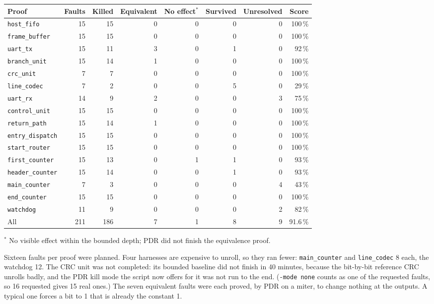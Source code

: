 \documentclass[11pt,a4paper]{article}
\newcommand{\sig}[1]{\texttt{#1}}
\begin{document}
\begin{center}\small
\begin{tabularx}{\linewidth}{@{}L r r r r r r r@{}}
\toprule
Proof & Faults & Killed & Equivalent & No effect$^*$ & Survived & Unresolved & Score \\
\midrule
\sig{host\_fifo} & 15 & 15 & 0 & 0 & 0 & 0 & 100\,\% \\
\sig{frame\_buffer} & 15 & 15 & 0 & 0 & 0 & 0 & 100\,\% \\
\sig{uart\_tx} & 15 & 11 & 3 & 0 & 1 & 0 & 92\,\% \\
\sig{branch\_unit} & 15 & 14 & 1 & 0 & 0 & 0 & 100\,\% \\
\sig{crc\_unit} & 7 & 7 & 0 & 0 & 0 & 0 & 100\,\% \\
\sig{line\_codec} & 7 & 2 & 0 & 0 & 5 & 0 & 29\,\% \\
\sig{uart\_rx} & 14 & 9 & 2 & 0 & 0 & 3 & 75\,\% \\
\sig{control\_unit} & 15 & 15 & 0 & 0 & 0 & 0 & 100\,\% \\
\sig{return\_path} & 15 & 14 & 1 & 0 & 0 & 0 & 100\,\% \\
\sig{entry\_dispatch} & 15 & 15 & 0 & 0 & 0 & 0 & 100\,\% \\
\sig{start\_router} & 15 & 15 & 0 & 0 & 0 & 0 & 100\,\% \\
\sig{first\_counter} & 15 & 13 & 0 & 1 & 1 & 0 & 93\,\% \\
\sig{header\_counter} & 15 & 14 & 0 & 0 & 1 & 0 & 93\,\% \\
\sig{main\_counter} & 7 & 3 & 0 & 0 & 0 & 4 & 43\,\% \\
\sig{end\_counter} & 15 & 15 & 0 & 0 & 0 & 0 & 100\,\% \\
\sig{watchdog} & 11 & 9 & 0 & 0 & 0 & 2 & 82\,\% \\
\midrule
All & 211 & 186 & 7 & 1 & 8 & 9 & 91.6\,\% \\
\bottomrule
\end{tabularx}
\end{center}
{\small $^*$ No visible effect within the bounded depth; PDR did not finish the equivalence proof.}

Sixteen faults per proof were planned. Four harnesses are expensive to unroll, so they ran fewer: \sig{main\_counter} and \sig{line\_codec} 8 each, the watchdog 12. The CRC unit was not completed: its bounded baseline did not finish in 40 minutes, because the bit-by-bit reference CRC unrolls badly, and the PDR kill mode the script now offers for it was not run to the end. (\sig{-mode none} counts as one of the requested faults, so 16 requested gives 15 real ones.) The seven equivalent faults were each proved, by PDR on a miter, to change nothing at the outputs. A typical one forces a bit to 1 that is already the constant 1.
\end{document}
